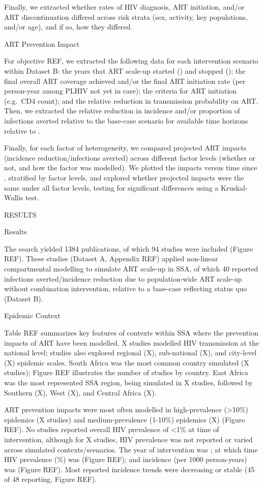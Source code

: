 Finally, we extracted whether rates of HIV diagnosis, ART initiation, and/or ART discontinuation
differed across risk strata (sex, activity, key populations, and/or age),
and if so, how they differed.

ART Prevention Impact

For objective REF, we extracted
the following data for each intervention scenario within Dataset B:
the years that ART scale-up started () and stopped ();
the final overall ART coverage achieved and/or
the final ART initiation rate (per person-year among PLHIV not yet in care);
the criteria for ART initiation (e.g.\ CD4 count); and
the relative reduction in transmission probability on ART.
Then, we extracted the
relative reduction in incidence and/or proportion of infections averted
relative to the base-case scenario for available time horizons relative to .

Finally, for each factor of heterogeneity,
we compared projected ART impacts (incidence reduction/infections averted)
across different factor levels (whether or not, and how the factor was modelled).
We plotted the impacts versus time since , stratified by factor levels,
and explored whether projected impacts were the same under all factor levels,
testing for significant differences using a Kruskal-Wallis test.

RESULTS

Results

The search yielded 1384 publications,
of which 94 studies were included (Figure REF).
These studies (Dataset A, Appendix REF)
applied non-linear compartmental modelling to simulate ART scale-up in SSA,
of which 40 reported infections averted/incidence reduction
due to population-wide ART scale-up without combination intervention,
relative to a base-case reflecting status quo (Dataset B).

Epidemic Context

Table REF summarizes key features of contexts within SSA
where the prevention impacts of ART have been modelled.
X studies modelled HIV transmission at the national level;
studies also explored
regional (X),
sub-national (X), and
city-level (X) epidemic scales.
South Africa was the most common country simulated (X studies);
Figure REF illustrates the number of studies by country.
East Africa was the most represented SSA region, being simulated in X studies,
followed by Southern (X), West (X), and Central Africa (X).

ART prevention impacts were most often modelled in
high-prevalence ({>10\%}) epidemics (X studies) and
medium-prevalence ({1-10\%}) epidemics (X) (Figure REF).
No studies reported overall HIV prevalence of {<1\%} at time of intervention,
although for X studies, HIV prevalence was
not reported or varied across simulated contexts/scenarios.
The \xdmdef year of intervention was ; at which time
HIV prevalence (\%) was  (Figure REF); and
incidence (per 1000 person-years) was  (Figure REF).
Most reported incidence trends were decreasing or stable
(45 of 48 reporting, Figure REF). 

